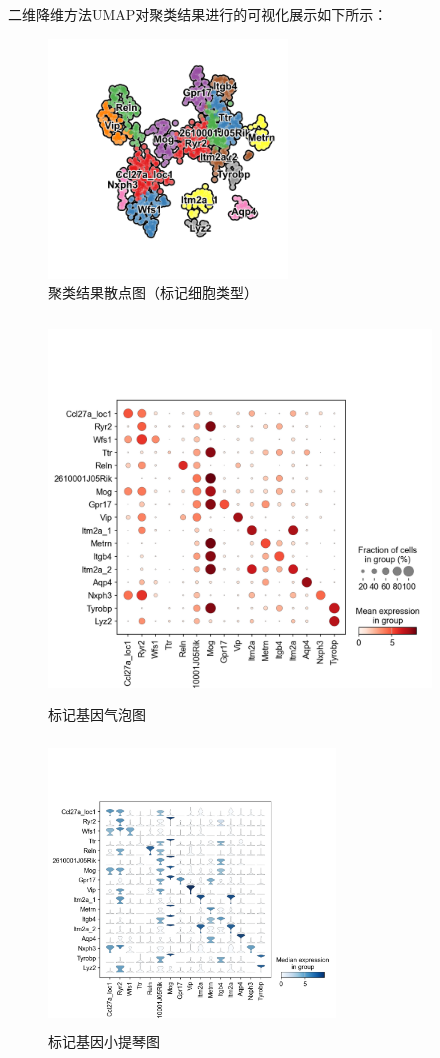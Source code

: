\documentclass {article}
\begin{document}
	二维降维方法UMAP对聚类结果进行的可视化展示如下所示：
	\begin{figure}[H]
		\centering
		\includegraphics[width=2.5in,height=2.5in]{figures/fig5.png}
		\caption{聚类结果散点图（标记细胞类型）}
	\end{figure}
	
	\begin{figure}[H]
		\centering
		\includegraphics[width=4in,height=4in]{figures/fig6.png}
		\caption{标记基因气泡图}
	\end{figure}
	
	\begin{figure}[H]
		\centering
		\includegraphics[width=3in,height=3in]{figures/fig7.png}
		\caption{标记基因小提琴图}
	\end{figure}
	
\end{document}
